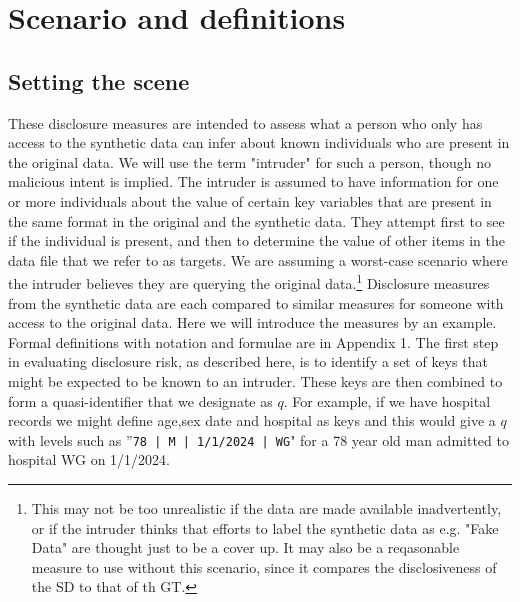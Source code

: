\documentclass[12pt]{article}
\begin{document}
\section{Scenario and definitions}\label{sec:sc_def_not}
\subsection{Setting the scene}\label{subsec:scen}
These disclosure measures are intended to assess what a person who only has access 
to the synthetic data can infer about known individuals who are present in the original data. We will use the term "intruder" for such a person, though no malicious intent is implied. The intruder is assumed to have information for one or more individuals about the value of certain key variables that are present in the same format in the original and the synthetic data. They attempt first to see if the individual is present, and then to determine the value of other items in the data file that we refer to as targets. We are assuming a worst-case scenario where the intruder believes 
they are querying the original data.\footnote{This may not be too unrealistic if the data are made available inadvertently, or if the intruder thinks that efforts to label the synthetic data as e.g. "Fake Data" are thought just to be a cover up. It may also be a reqasonable measure to use without this scenario, since it compares the disclosiveness of the SD to that of th GT.}
Disclosure measures from the synthetic data are each compared to similar measures for someone with access to the original data. Here we will introduce the measures by an example. Formal definitions with notation and formulae are in Appendix 1.
The first step in evaluating disclosure risk, as described here, is to identify a set of keys that might be expected to be known to an intruder. These keys are then combined to form a quasi-identifier that we designate as $q$. For example, if we have hospital records we might define age,sex date and hospital as keys and this would give a $q$ with levels such as ''\texttt{78 | M | 1/1/2024 | WG}" for a 78 year old man admitted to hospital WG on 1/1/2024.
\end{document}
